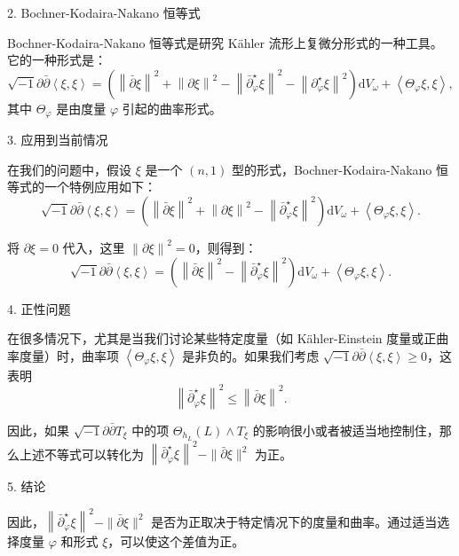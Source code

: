 2. Bochner-Kodaira-Nakano 恒等式
\begin{thm}\label{thm:BKN}
    Bochner-Kodaira-Nakano 恒等式是研究 Kähler 流形上复微分形式的一种工具。它的一种形式是：
$$
\sqrt{-1} \partial \bar{\partial} \left\langle \xi, \xi \right\rangle = \left( \left\| \bar{\partial} \xi \right\|^2 + \left\| \partial \xi \right\|^2 - \left\| \bar{\partial}_{\varphi}^{\star} \xi \right\|^2 - \left\| \partial_{\varphi}^{\star} \xi \right\|^2 \right) \mathrm{d} V_\omega + \left\langle \Theta_{\varphi} \xi, \xi \right\rangle,
$$
其中 $\Theta_{\varphi}$ 是由度量 $\varphi$ 引起的曲率形式。
\end{thm}
    
3. 应用到当前情况

在我们的问题中，假设 $\xi$ 是一个 $(n,1)$ 型的形式，Bochner-Kodaira-Nakano 恒等式的一个特例应用如下：
$$
\sqrt{-1} \partial \bar{\partial} \left\langle \xi, \xi \right\rangle = \left( \left\| \bar{\partial} \xi \right\|^2 + \left\| \partial \xi \right\|^2 - \left\| \bar{\partial}_{\varphi}^{\star} \xi \right\|^2 \right) \mathrm{d} V_\omega + \left\langle \Theta_{\varphi} \xi, \xi \right\rangle.
$$

将 $\partial \xi = 0$ 代入，这里 $\left\| \partial \xi \right\|^2 = 0$，则得到：
$$
\sqrt{-1} \partial \bar{\partial} \left\langle \xi, \xi \right\rangle = \left( \left\| \bar{\partial} \xi \right\|^2 - \left\| \bar{\partial}_{\varphi}^{\star} \xi \right\|^2 \right) \mathrm{d} V_\omega + \left\langle \Theta_{\varphi} \xi, \xi \right\rangle.
$$

4. 正性问题

在很多情况下，尤其是当我们讨论某些特定度量（如 Kähler-Einstein 度量或正曲率度量）时，曲率项 $\left\langle \Theta_{\varphi} \xi, \xi \right\rangle$ 是非负的。如果我们考虑 $\sqrt{-1} \partial \bar{\partial} \left\langle \xi, \xi \right\rangle \geq 0$，这表明
$$
\left\| \bar{\partial}_{\varphi}^{\star} \xi \right\|^2 \leq \left\| \bar{\partial} \xi \right\|^2.
$$

因此，如果 $\sqrt{-1} \partial \bar{\partial} T_{\xi}$ 中的项 $\Theta_{h_L}(L) \wedge T_{\xi}$ 的影响很小或者被适当地控制住，那么上述不等式可以转化为 $\left\|\bar{\partial}_{\varphi}^{\star} \xi\right\|^2 - \|\bar{\partial} \xi\|^2$ 为正。

5. 结论

因此，$\left\|\bar{\partial}_{\varphi}^{\star} \xi\right\|^2 - \|\bar{\partial} \xi\|^2$ 是否为正取决于特定情况下的度量和曲率。通过适当选择度量 $\varphi$ 和形式 $\xi$，可以使这个差值为正。



